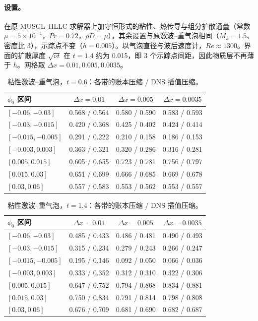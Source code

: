 \paragraph{设置。}在原 MUSCL–HLLC 求解器上加守恒形式的粘性、热传导与组分扩散通量（常数 $\mu=5\times10^{-4}$，$Pr=0.72$，$\rho D=\mu$），其余设置与原激波–重气泡相同（$M_s=1.5$、密度比 3），示踪点不变（$h=0.005$）。以气泡直径与波后速度计，$Re\approx1300$。界面的扩散厚度 $\sqrt{\nu t}$ 在 $t=1.4$ 约为 0.015，即 3 个示踪点间距，因此物质层不再薄于 $h$。网格取 $\Delta x=0.01,0.005,0.0035$。
\begin{table}[!htbp]\centering\small\caption{粘性激波–重气泡，$t=0.6$：各带的账本压缩 / DNS 插值压缩。}
\begin{tabular}{lccc}\toprule
$\phi_0$ 区间 & $\Delta x=0.01$ & $\Delta x=0.005$ & $\Delta x=0.0035$\\\midrule
$[-0.06,-0.03]$ & 0.568 / 0.564 & 0.580 / 0.590 & 0.583 / 0.593\\
$[-0.03,-0.015]$ & 0.420 / 0.368 & 0.425 / 0.402 & 0.424 / 0.414\\
$[-0.015,-0.005]$ & 0.291 / 0.222 & 0.210 / 0.158 & 0.186 / 0.153\\
$[-0.003,0.003]$ & 0.363 / 0.321 & 0.320 / 0.286 & 0.316 / 0.281\\
$[0.005,0.015]$ & 0.605 / 0.655 & 0.723 / 0.781 & 0.756 / 0.797\\
$[0.015,0.03]$ & 0.651 / 0.699 & 0.666 / 0.685 & 0.669 / 0.678\\
$[0.03,0.06]$ & 0.557 / 0.583 & 0.553 / 0.562 & 0.553 / 0.557\\
\bottomrule\end{tabular}\end{table}
\begin{table}[!htbp]\centering\small\caption{粘性激波–重气泡，$t=1.4$：各带的账本压缩 / DNS 插值压缩。}
\begin{tabular}{lccc}\toprule
$\phi_0$ 区间 & $\Delta x=0.01$ & $\Delta x=0.005$ & $\Delta x=0.0035$\\\midrule
$[-0.06,-0.03]$ & 0.485 / 0.433 & 0.486 / 0.481 & 0.490 / 0.493\\
$[-0.03,-0.015]$ & 0.315 / 0.234 & 0.279 / 0.243 & 0.266 / 0.247\\
$[-0.015,-0.005]$ & 0.195 / 0.146 & 0.092 / 0.050 & 0.066 / 0.036\\
$[-0.003,0.003]$ & 0.333 / 0.352 & 0.312 / 0.310 & 0.322 / 0.306\\
$[0.005,0.015]$ & 0.647 / 0.752 & 0.794 / 0.868 & 0.834 / 0.881\\
$[0.015,0.03]$ & 0.750 / 0.834 & 0.791 / 0.814 & 0.798 / 0.808\\
$[0.03,0.06]$ & 0.676 / 0.709 & 0.681 / 0.690 & 0.682 / 0.687\\
\bottomrule\end{tabular}\end{table}

